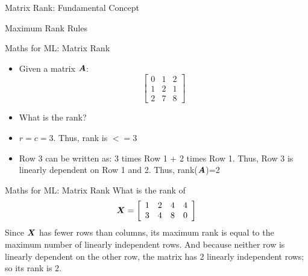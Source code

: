\documentclass{beamer}
\begin{document}
\begin{frame}{Matrix Rank: Fundamental Concept}

\begin{examplebox}{Maximum Rank Rules}
\end{examplebox}

\end{frame}

\begin{frame}{Maths for ML: Matrix Rank}
\begin{itemize}[<+-> ] 
\item Given a matrix $\bm{A}$:$$
\left[\begin{array}{lll}
	{0} & {1} & {2} \\
	{1} & {2} & {1} \\
	{2} & {7} & {8}
\end{array}\right]
$$
\item What is the rank?
\item $r=c=3$. Thus, rank is $<=3$
\item Row 3 can be written as: 3 times Row 1 + 2 times Row 1. Thus, Row 3 is linearly dependent on Row 1 and 2. Thus, rank($\bm{A}$)=2
\end{itemize}
\end{frame}


\begin{frame}{Maths for ML: Matrix Rank}
What is the rank of
\begin{equation*}
\bm{X} =\left[\begin{array}{llll}
{1} & {2} & {4} & {4} \\
{3} & {4} & {8} & {0}
\end{array}\right]
\end{equation*}
\pause Since $\bm{X}$ has fewer rows than columns, its maximum rank is equal to the maximum number of linearly independent rows. And because neither row is linearly dependent on the other row, the matrix has 2 linearly independent rows; so its rank is 2.
\end{frame}
\end{document}
